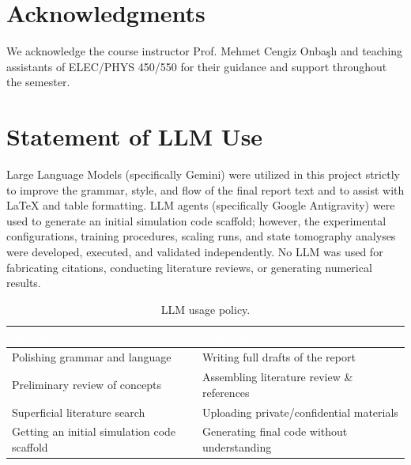 \documentclass[12pt, a4paper]{article}
\begin{document}
\newpage


\section{Acknowledgments}

We acknowledge the course instructor Prof. Mehmet Cengiz Onbaşlı and teaching assistants of ELEC/PHYS 450/550 for their guidance and support throughout the semester.

\newpage


\section{Statement of LLM Use}

\noindent Large Language Models (specifically Gemini) were utilized in this project strictly to improve the grammar, style, and flow of the final report text and to assist with LaTeX and table formatting. LLM agents (specifically Google Antigravity) were used to generate an initial simulation code scaffold; however, the experimental configurations, training procedures, scaling runs, and state tomography analyses were developed, executed, and validated independently. No LLM was used for fabricating citations, conducting literature reviews, or generating numerical results.

\begin{table}[H]
    \centering
    \caption{LLM usage policy.}
    \label{tab:11m_policy}
    \renewcommand{\arraystretch}{1.3}
    \begin{tabularx}{\textwidth}{|X|X|}
        \hline
        \rowcolor{darkred!90}
        \textcolor{white}{\textbf{Acceptable Uses}} &
        \textcolor{white}{\textbf{Unacceptable Uses}} \\
        \hline
        \rowcolor{darkred!20}
        Polishing grammar and language & Writing full drafts of the report \\
        \hline
        Preliminary review of concepts & Assembling literature review \& references \\
        \hline
        \rowcolor{darkred!20}
        Superficial literature search & Uploading private/confidential materials \\
        \hline
        Getting an initial simulation code scaffold & Generating final code without understanding \\
        \hline
    \end{tabularx}
\end{table}
\end{document}
